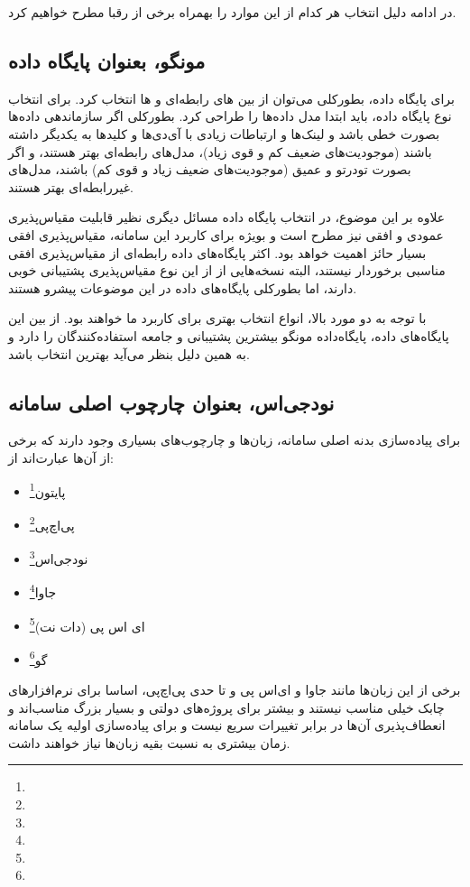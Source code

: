 در ادامه دلیل انتخاب هر کدام از این موارد را بهمراه برخی از رقبا مطرح خواهیم کرد.

\subsection{مونگو، بعنوان پایگاه داده}

برای پایگاه داده، بطورکلی می‌توان از بین های رابطه‌ای و ها انتخاب کرد. برای انتخاب نوع پایگاه داده، باید ابتدا مدل داده‌ها را طراحی کرد. بطورکلی اگر سازماندهی داده‌ها بصورت خطی باشد و لینک‌ها و ارتباطات زیادی با آی‌دی‌ها و کلیدها به یکدیگر داشته باشند (موجودیت‌های ضعیف کم و قوی زیاد)، مدل‌های رابطه‌ای بهتر هستند، و اگر بصورت تودرتو و عمیق (موجودیت‌های ضعیف زیاد و قوی کم) باشند، مدل‌های غیررابطه‌ای بهتر هستند.

علاوه بر این موضوع، در انتخاب پایگاه داده مسائل دیگری نظیر قابلیت مقیاس‌پذیری عمودی و افقی نیز مطرح است و بویژه برای کاربرد این سامانه، مقیاس‌پذیری افقی بسیار حائز اهمیت خواهد بود. اکثر پایگاه‌های داده رابطه‌ای از مقیاس‌پذیری افقی مناسبی برخوردار نیستند، البته نسخه‌هایی از  از این نوع مقیاس‌پذیری پشتیبانی خوبی دارند، اما بطورکلی پایگاه‌های داده  در این موضوعات پیشرو هستند.

با توجه به دو مورد بالا، انواع  انتخاب بهتری برای کاربرد ما خواهند بود. از بین این پایگاه‌های داده، پایگاه‌داده مونگو بیشترین پشتیبانی و جامعه استفاده‌کنندگان را دارد و به همین دلیل بنظر می‌آید بهترین انتخاب باشد.

\subsection{نودجی‌اس، بعنوان چارچوب اصلی سامانه}

برای پیاده‌سازی بدنه اصلی سامانه، زبان‌ها و چارچوب‌های بسیاری وجود دارند که برخی از آن‌ها عبارت‌اند از:
\begin{itemize}
	\item پایتون\footnote{}
	\item پی‌اچ‌پی\footnote{}
	\item نودجی‌اس\footnote{}
	\item جاوا\footnote{}
	\item ای اس پی (دات نت)\footnote{}
	\item گو\footnote{}
\end{itemize}

برخی از این زبان‌ها مانند جاوا و ای‌اس پی و تا حدی پی‌اچ‌پی، اساسا برای نرم‌افزارهای چابک خیلی مناسب نیستند و بیشتر برای پروژه‌های دولتی و بسیار بزرگ مناسب‌اند و انعطاف‌پذیری آن‌ها در برابر تغییرات سریع نیست و برای پیاده‌سازی اولیه یک سامانه زمان بیشتری به نسبت بقیه زبان‌ها نیاز خواهند داشت.

